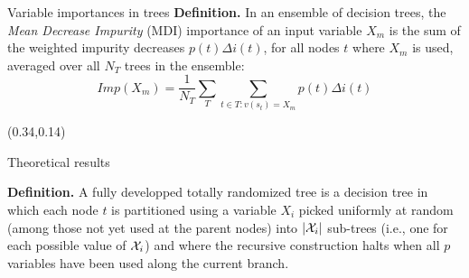 \documentclass[final]{beamer}
\begin{document}
\begin{frame}{}
\begin{textblock}{0.32}
\begin{block}{Variable importances in trees \phantom{p}}
\textbf{Definition.} In an ensemble of decision trees, the \textit{Mean
Decrease Impurity} (MDI) importance of an input variable $X_m$ is the
sum of the weighted impurity decreases $p(t)\Delta i(t)$, for all nodes $t$
where $X_m$ is used, averaged over all $N_T$ trees in the ensemble:
\begin{equation*}\label{eq:mdi}
Imp(X_m) = \frac{1}{N_T} \sum_{T} \sum_{t \in T:v(s_t) = X_m} p(t) \Delta i(t)
\end{equation*}

\end{block}



\end{textblock}




\begin{textblock}{0.32}(0.34,0.14)

\begin{block}{Theoretical results \phantom{p}}

\textbf{Definition.} A fully developped  totally randomized tree is a decision tree in which each node $t$ is
partitioned using a variable $X_i$ picked uniformly at random (among those not
yet used at the parent nodes) into $|{\cal
X}_i|$ sub-trees (i.e., one for each possible value of ${\cal X}_i$) and where
the recursive construction halts when all $p$ variables have been
used along the current branch.

\vspace{0.3cm}


\end{block}
\end{textblock}
\end{frame}
\end{document}
